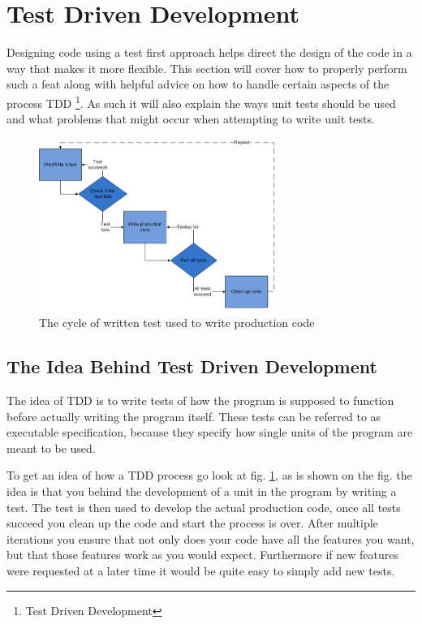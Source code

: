 
\section{Test Driven Development}

Designing code using a test first approach helps direct the design
of the code in a way that makes it more flexible. This section will
cover how to properly perform such a feat along with helpful advice
on how to handle certain aspects of the process TDD%
\footnote{Test Driven Development%
}. As such it will also explain the ways unit tests should be used
and what problems that might occur when attempting to write unit tests. 

\begin{figure}
\begin{centering}
\includegraphics[width=0.7\textwidth]{TestWrittenCycle}
\par\end{centering}

\caption{The cycle of written test used to write production code\label{fig:TestWrittenCycle}}


\end{figure}



\subsection*{The Idea Behind Test Driven Development}

The idea of TDD is to write tests of how the program is supposed to
function before actually writing the program itself. These tests can
be referred to as executable specification, because they specify how
single units of the program are meant to be used.

To get an idea of how a TDD process go look at fig. \ref{fig:TestWrittenCycle},
as is shown on the fig. the idea is that you behind the development
of a unit in the program by writing a test. The test is then used
to develop the actual production code, once all tests succeed you
clean up the code and start the process is over. After multiple iterations
you ensure that not only does your code have all the features you
want, but that those features work as you would expect. Furthermore
if new features were requested at a later time it would be quite easy
to simply add new tests. 

